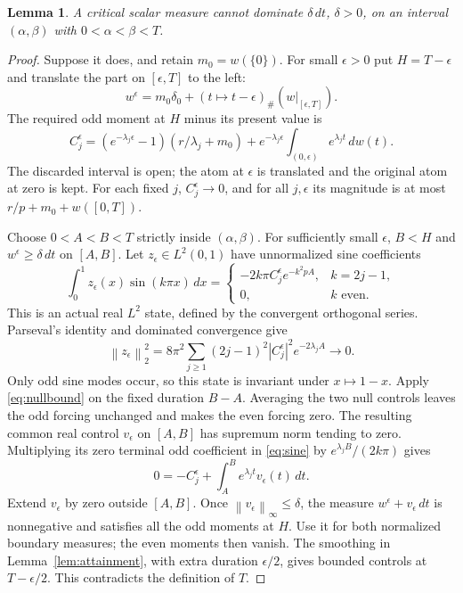 \documentclass[11pt]{article}
\newtheorem{lemma}[theorem]{Lemma}
\theoremstyle{remark}
\newcommand{\norm}[1]{\left\lVert #1\right\rVert}
\begin{document}
\begin{lemma}\label{lem:slack}
A critical scalar measure cannot dominate $\delta\,dt$, $\delta>0$,
on an interval $(\alpha,\beta)$ with $0<\alpha<\beta<T$.
\end{lemma}
\begin{proof}
Suppose it does, and retain $m_0=w(\{0\})$. For small $\epsilon>0$ put
$H=T-\epsilon$ and translate the part on $[\epsilon,T]$ to the left:
\[
 w^\epsilon=m_0\delta_0+
      (t\mapsto t-\epsilon)_\#(w|_{[\epsilon,T]}).
\]
The required odd moment at $H$ minus its present value is
\begin{equation}\label{eq:deficit}
 C_j^\epsilon=(e^{-\lambda_j\epsilon}-1)
                  (r/\lambda_j+m_0)
       +e^{-\lambda_j\epsilon}
          \int_{(0,\epsilon)}e^{\lambda_jt}\,dw(t).
\end{equation}
The discarded interval is open; the atom at $\epsilon$ is translated and
the original atom at zero is kept. For each fixed $j$, $C_j^\epsilon\to0$,
and for all $j,\epsilon$ its magnitude is at most
$r/p+m_0+w([0,T])$.

Choose $0<A<B<T$ strictly inside $(\alpha,\beta)$. For sufficiently small
$\epsilon$, $B<H$ and $w^\epsilon\ge\delta\,dt$ on $[A,B]$. Let
$z_\epsilon\in L^2(0,1)$ have unnormalized sine coefficients
\[
 \int_0^1z_\epsilon(x)\sin(k\pi x)\,dx
 =\begin{cases}
 -2k\pi C_j^\epsilon e^{-k^2pA},&k=2j-1,\\
 0,&k\text{ even}.
 \end{cases}
\]
This is an actual real $L^2$ state, defined by the convergent orthogonal
series. Parseval's identity and dominated convergence give
\begin{equation}\label{eq:smallstate}
 \norm{z_\epsilon}_2^2
 =8\pi^2\sum_{j\ge1}(2j-1)^2|C_j^\epsilon|^2e^{-2\lambda_jA}
 \longrightarrow0.
\end{equation}
Only odd sine modes occur, so this state is invariant under $x\mapsto1-x$.
Apply \eqref{eq:nullbound} on the fixed duration $B-A$. Averaging the two
null controls leaves the odd forcing unchanged and makes the even forcing
zero. The resulting common real control $v_\epsilon$ on $[A,B]$ has
supremum norm tending to zero. Multiplying its zero terminal odd coefficient
in \eqref{eq:sine} by $e^{\lambda_jB}/(2k\pi)$ gives
\[
 0=-C_j^\epsilon+\int_A^B e^{\lambda_jt}v_\epsilon(t)\,dt.
\]
Extend $v_\epsilon$ by zero outside $[A,B]$. Once
$\norm{v_\epsilon}_\infty\le\delta$, the measure
$w^\epsilon+v_\epsilon\,dt$ is nonnegative and satisfies all the odd
moments at $H$. Use it for both normalized boundary measures; the even
moments then vanish. The smoothing in Lemma~\ref{lem:attainment}, with extra
duration $\epsilon/2$, gives bounded controls at $T-\epsilon/2$. This
contradicts the definition of $T$.
\end{proof}
\end{document}
